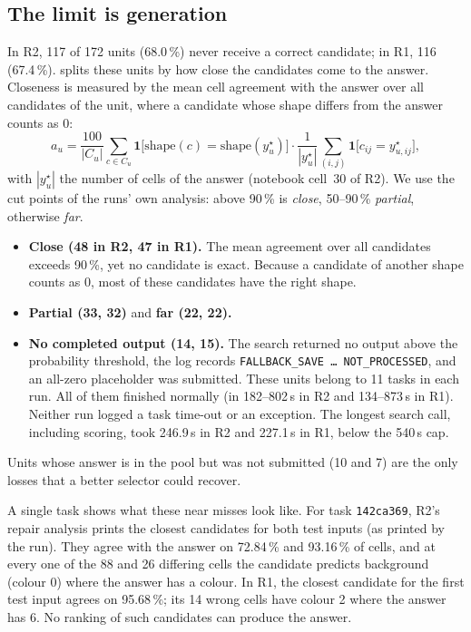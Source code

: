 \documentclass[11pt]{article}
\newcommand{\code}[1]{\texttt{#1}}
\newcommand{\R}[1]{R#1}
\begin{document}
\subsection{The limit is generation}
\label{sec:generation}

In \R{2}, 117 of 172 units (68.0\,\%) never receive a correct candidate; in \R{1}, 116 (67.4\,\%).
 splits these units by how close the candidates come to the answer. Closeness is measured by the mean cell agreement with the answer over all candidates of the unit, where a candidate whose shape differs from the answer counts as 0:
\begin{equation}
\label{eq:agree}
a_u = \frac{100}{|C_u|} \sum_{c \in C_u} \mathbf{1}\big[\mathrm{shape}(c) = \mathrm{shape}(y^\star_u)\big] \cdot \frac{1}{|y^\star_u|} \sum_{(i,j)} \mathbf{1}\big[c_{ij} = y^\star_{u,ij}\big] ,
\end{equation}
with $|y^\star_u|$ the number of cells of the answer (notebook cell~30 of \R{2}). We use the cut points of the runs' own analysis: above 90\,\% is \emph{close}, 50--90\,\% \emph{partial}, otherwise \emph{far}.
\begin{itemize}
\item \textbf{Close (48 in \R{2}, 47 in \R{1}).} The mean agreement over all candidates exceeds 90\,\%, yet no candidate is exact. Because a candidate of another shape counts as 0, most of these candidates have the right shape.
\item \textbf{Partial (33, 32)} and \textbf{far (22, 22).}
\item \textbf{No completed output (14, 15).} The search returned no output above the probability threshold, the log records \code{FALLBACK\_SAVE \ldots{} NOT\_PROCESSED}, and an all-zero placeholder was submitted. These units belong to 11 tasks in each run. All of them finished normally (in 182--802\,s in \R{2} and 134--873\,s in \R{1}). Neither run logged a task time-out or an exception. The longest search call, including scoring, took 246.9\,s in \R{2} and 227.1\,s in \R{1}, below the 540\,s cap.
\end{itemize}
Units whose answer is in the pool but was not submitted (10 and 7) are the only losses that a better selector could recover.

A single task shows what these near misses look like. For task \code{142ca369}, \R{2}'s repair analysis prints the closest candidates for both test inputs (as printed by the run). They agree with the answer on 72.84\,\% and 93.16\,\% of cells, and at every one of the 88 and 26 differing cells the candidate predicts background (colour 0) where the answer has a colour.
In \R{1}, the closest candidate for the first test input agrees on 95.68\,\%; its 14 wrong cells have colour 2 where the answer has 6.
No ranking of such candidates can produce the answer.
\end{document}
